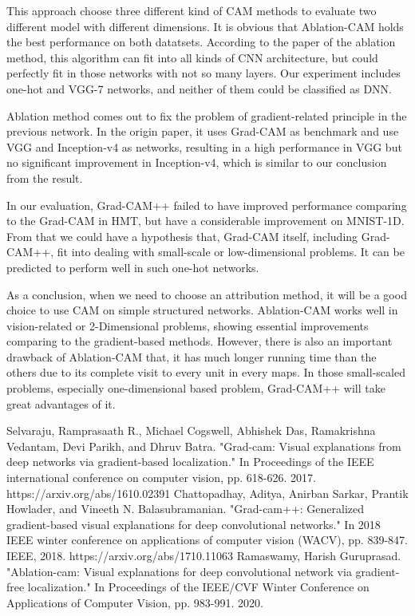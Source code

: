 \documentclass[conference]{IEEEtran}
\begin{document}
This approach choose three different kind of CAM methods to evaluate two different model with different dimensions. It is obvious that Ablation-CAM holds the best performance on both datatsets. According to the paper of the ablation method, this algorithm can fit into all kinds of CNN architecture, but could perfectly fit in those networks with not so many layers. Our experiment includes one-hot and VGG-7 networks, and neither of them could be classified as DNN.\par
Ablation method comes out to fix the problem of gradient-related principle in the previous network. In the origin paper, it uses Grad-CAM as benchmark and use VGG and Inception-v4 as networks, resulting in a high performance in VGG but no significant improvement in Inception-v4, which is similar to our conclusion from the result.\par
In our evaluation, Grad-CAM++ failed to have improved performance comparing to the Grad-CAM in HMT, but have a considerable improvement on MNIST-1D. From that we could have a hypothesis that, Grad-CAM itself, including Grad-CAM++, fit into dealing with small-scale or low-dimensional problems. It can be predicted to perform well in such one-hot networks.\par
As a conclusion, when we need to choose an attribution method, it will be a good choice to use CAM on simple structured networks. Ablation-CAM works well in vision-related or 2-Dimensional problems, showing essential improvements comparing to the gradient-based methods. However, there is also an important drawback of Ablation-CAM that, it has much longer running time than the others due to its complete visit to every unit in every maps. In those small-scaled problems, especially one-dimensional based problem, Grad-CAM++ will take great advantages of it.

\begin{thebibliography}{00}
Selvaraju, Ramprasaath R., Michael Cogswell, Abhishek Das, Ramakrishna Vedantam, Devi Parikh, and Dhruv Batra. "Grad-cam: Visual explanations from deep networks via gradient-based localization." In Proceedings of the IEEE international conference on computer vision, pp. 618-626. 2017. https://arxiv.org/abs/1610.02391
 Chattopadhay, Aditya, Anirban Sarkar, Prantik Howlader, and Vineeth N. Balasubramanian. "Grad-cam++: Generalized gradient-based visual explanations for deep convolutional networks." In 2018 IEEE winter conference on applications of computer vision (WACV), pp. 839-847. IEEE, 2018. https://arxiv.org/abs/1710.11063
 Ramaswamy, Harish Guruprasad. "Ablation-cam: Visual explanations for deep convolutional 
network via gradient-free localization." In Proceedings of the IEEE/CVF Winter Conference on Applications of Computer Vision, pp. 983-991. 2020. 
\end{thebibliography}
\end{document}

